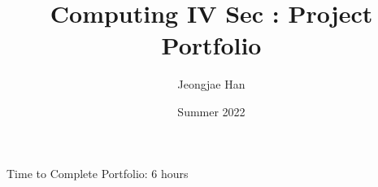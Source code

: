 \documentclass[12pt]{article}
\author{Jeongjae Han}
\date{Summer 2022}
\title{Computing IV Sec \secno: Project Portfolio}
\newcommand{\timetocomplete}{6 hours}
\begin{document}
\maketitle

\tableofcontents

\vfill
Time to Complete Portfolio: \timetocomplete

\newpage










\end{document}
